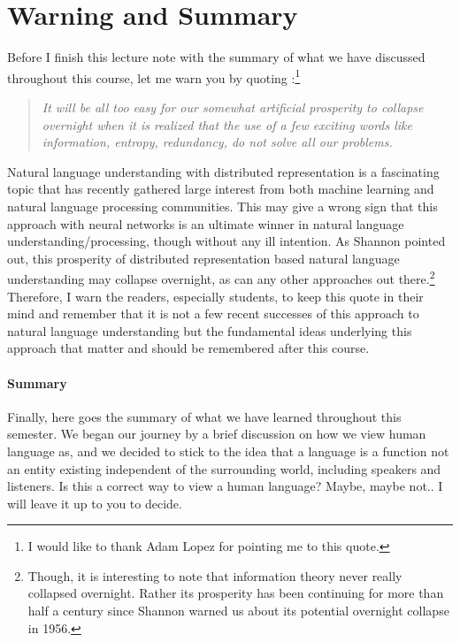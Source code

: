 \documentclass{report}
\begin{document}
\section{Warning and Summary}

Before I finish this lecture note with the summary of what we have discussed
throughout this course, let me warn you by quoting
\citet{shannon1956bandwagon}:\footnote{
    I would like to thank Adam Lopez for pointing me to this quote.
}

\begin{quote}
    \it
    It will be all too easy for our somewhat artificial prosperity to collapse
    overnight when it is realized that the use of a few exciting words like
    information, entropy, redundancy, do not solve all our problems.
\end{quote}

Natural language understanding with distributed representation is a fascinating
topic that has recently gathered large interest from both machine learning and
natural language processing communities. This may give a wrong sign that this
approach with neural networks is an ultimate winner in natural language
understanding/processing, though without any ill intention. As Shannon pointed
out, this prosperity of distributed representation based natural language
understanding may collapse overnight, as can any other approaches out
there.\footnote{
    Though, it is interesting to note that information theory never really
    collapsed overnight. Rather its prosperity has been continuing for more than
    half a century since Shannon warned us about its potential overnight
    collapse in 1956.
} Therefore, I warn the readers, especially students, to keep this quote in
their mind and remember that it is not a few recent successes of this approach
to natural language understanding but the fundamental ideas underlying this
approach that matter and should be remembered after this course.

\paragraph{Summary}

Finally, here goes the summary of what we have learned throughout this semester.
We began our journey by a brief discussion on how we view human language as, and
we decided to stick to the idea that a language is a function not an entity
existing independent of the surrounding world, including speakers and listeners.
Is this a correct way to view a human language? Maybe, maybe not.. I will leave
it up to you to decide.
\end{document}
